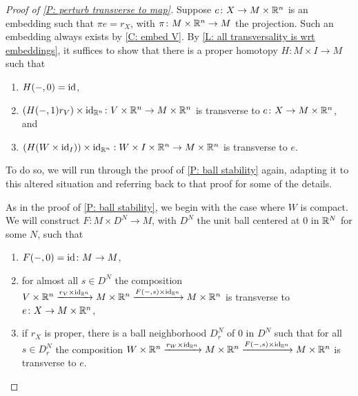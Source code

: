 \begin{proof}[Proof of \cref{P: perturb transverse to map}]
	Suppose $e \colon X \to M \times \mathbb{R}^n$ is an embedding such that $\pi e = r_X$, with $\pi \colon M \times \mathbb{R}^n \to M$ the projection.
	Such an embedding always exists by \cref{C: embed V}.
	By \cref{L: all transversality is wrt embeddings}, it suffices to show that there is a proper  homotopy $H \colon M \times I \to M$ such that
	\begin{enumerate}
		\item $H(-,0) = \mathrm{id}$,
		\item $(H(-,1)r_V) \times \mathrm{id}_{\mathbb{R}^n} \colon V \times \mathbb{R}^n \to M \times \mathbb{R}^n$ is transverse to $e \colon X \to M \times \mathbb{R}^n$, and
		\item $(H (W \times \mathrm{id}_I)) \times \mathrm{id}_{\mathbb{R}^n}: W \times I \times \mathbb{R}^n \to M \times \mathbb{R}^n$ is transverse to $e$.
	\end{enumerate}
	To do so, we will run through the proof of \cref{P: ball stability} again, adapting it to this altered situation and referring back to that proof for some of the details.

	As in the proof of \cref{P: ball stability}, we begin with the case where $W$ is compact.
	We will construct $F \colon M \times D^N \to M$, with $D^N$ the unit ball centered at $0$ in $\mathbb{R}^N$ for some $N$, such that

	\begin{enumerate}
		\item $F(-,0) = \mathrm{id} \colon M \to M$,
		\item for almost all $s \in D^N$ the composition $V \times \mathbb{R}^n \xrightarrow{r_V \times \mathrm{id}_{\mathbb{R}^n}} M \times \mathbb{R}^n \xrightarrow{F(-,s) \times \mathrm{id}_{\mathbb{R}^n}} M \times \mathbb{R}^n$ is transverse to $e \colon X \to M \times \mathbb{R}^n$,

		\item if $r_X$ is proper, there is a ball neighborhood $D_r^N$ of $0$ in $D^N$ such that for all $s \in D_r^N$ the composition $W \times \mathbb{R}^n \xrightarrow{r_W \times \mathrm{id}_{\mathbb{R}^n}} M \times \mathbb{R}^n \xrightarrow{F(-,s) \times \mathrm{id}_{\mathbb{R}^n}}M \times \mathbb{R}^n$ is transverse to $e$.
	\end{enumerate}


\end{proof}
